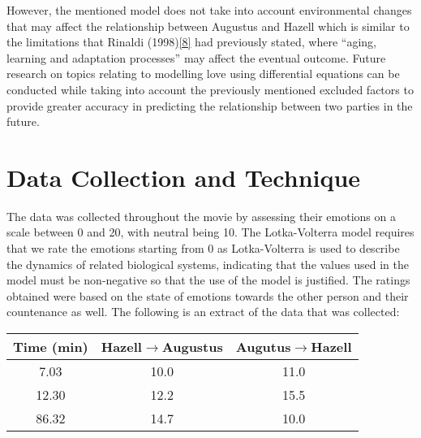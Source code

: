 \documentclass{article}
\newcommand*\circled[1]{\tikz[baseline=(char.base)]{
            \node[shape=circle,draw,inner sep=2pt] (char) {#1};}}
\begin{document}
\newline \noindent
However, the mentioned model does not take into account environmental changes that may affect the relationship between Augustus and Hazell which is similar to the limitations that Rinaldi (1998)\hyperlink{source8}{[8]} had previously stated, where ``aging, learning and adaptation processes'' may affect the eventual outcome. Future research on topics relating to modelling love using differential equations can be conducted while taking into account the previously mentioned excluded factors to provide greater accuracy in predicting the relationship between two parties in the future.\\
\section*{\circled{2} Data Collection and Technique}

The data was collected throughout the movie by assessing their emotions on a scale between 0 and 20, with neutral being 10. The Lotka-Volterra model requires that we rate the emotions starting from 0 as Lotka-Volterra is used to describe the dynamics of related biological systems, indicating that the values used in the model must be non-negative so that the use of the model is justified. The ratings obtained were based on the state of emotions towards the other person and their countenance as well. The following is an extract of the data that was collected:

\begin{center}
\begin{tabular}{|c|c|c|}
\hline
Time (min) & Hazell$\rightarrow$Augustus &Augutus$\rightarrow$Hazell\\\hline
7.03 & 10.0 & 11.0 \\\hline
12.30 & 12.2 & 15.5 \\\hline
86.32 & 14.7 & 10.0 \\\hline

\end{tabular}
\leavevmode
\end{center}
\end{document}
